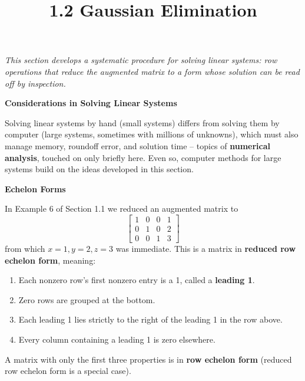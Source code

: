 \documentclass{article}
\title{1.2 Gaussian Elimination}
\date{}
\author{}
\newcommand{\redheading}[1]{{\vspace{2mm}\noindent\Large\bfseries\color{red!55!black} #1\par}\vspace{2mm}}
\theoremstyle{mystyle}
\begin{document}
\maketitle

{\itshape\color{blue!45!black}
This section develops a systematic procedure for solving linear systems: row operations that reduce the augmented matrix to a form whose solution can be read off by inspection.\par}

\redheading{Considerations in Solving Linear Systems}

Solving linear systems by hand (small systems) differs from solving them by computer (large systems, sometimes with millions of unknowns), which must also manage memory, roundoff error, and solution time -- topics of \textbf{numerical analysis}, touched on only briefly here. Even so, computer methods for large systems build on the ideas developed in this section.

\redheading{Echelon Forms}

In Example 6 of Section 1.1 we reduced an augmented matrix to
\[
\begin{bmatrix} 1&0&0&1\\ 0&1&0&2\\ 0&0&1&3\end{bmatrix}
\]
from which $x=1,y=2,z=3$ was immediate. This is a matrix in \textbf{reduced row echelon form}, meaning:
\begin{enumerate}
    \item Each nonzero row's first nonzero entry is a 1, called a \textbf{leading 1}.
    \item Zero rows are grouped at the bottom.
    \item Each leading 1 lies strictly to the right of the leading 1 in the row above.
    \item Every column containing a leading 1 is zero elsewhere.
\end{enumerate}
A matrix with only the first three properties is in \textbf{row echelon form} (reduced row echelon form is a special case).
\end{document}
